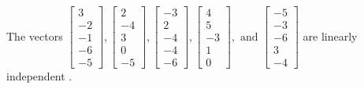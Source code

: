 \begin{exercise}
\begin{exerciseStatement}
  \end{exerciseStatement}
  \begin{exerciseAnswer}
   The vectors \(\left[\begin{array}{r}
3 \\
-2 \\
-1 \\
-6 \\
-5
\end{array}\right] , \left[\begin{array}{r}
2 \\
-4 \\
3 \\
0 \\
-5
\end{array}\right] , \left[\begin{array}{r}
-3 \\
2 \\
-4 \\
-4 \\
-6
\end{array}\right] , \left[\begin{array}{r}
4 \\
5 \\
-3 \\
1 \\
0
\end{array}\right] , \text{ and } \left[\begin{array}{r}
-5 \\
-3 \\
-6 \\
3 \\
-4
\end{array}\right]\) are 
  	 linearly independent  .
  


  \end{exerciseAnswer}
\end{exercise}